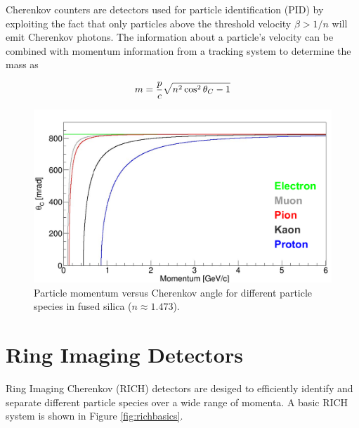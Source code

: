 Cherenkov counters are detectors used for particle identification (PID) by exploiting the fact that only particles above the threshold velocity $\beta > 1/n$ will emit Cherenkov photons. The information about a particle's velocity can be combined with momentum information from a tracking system to determine the mass as \cite{ParticleDetectionHandbook}

\begin{equation}
	m = \frac{p}{c} \sqrt{n^2 \cos^2\theta_{C} - 1}
	\label{eq:mass}
\end{equation}

\begin{figure}[ht]
	\centering
	\includegraphics[scale=.8]{figures/angle_seperation_6.pdf}
	\caption{Particle momentum versus Cherenkov angle for different particle species in fused silica ($n \approx 1.473$).}
	\label{fig:angleseperation}
\end{figure}

\section{Ring Imaging Detectors}
Ring Imaging Cherenkov (RICH) detectors are desiged to efficiently identify and separate different particle species over a wide range of momenta. A basic RICH system is shown in Figure \ref{fig:richbasics}. 

